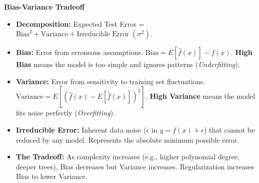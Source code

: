 
\vspace{1mm}
\noindent\textbf{Bias-Variance Tradeoff}
\begin{itemize}[leftmargin=*, nosep]
    \item \textbf{Decomposition:} Expected Test Error = $\text{Bias}^2 + \text{Variance} + \text{Irreducible Error } (\sigma^2)$.
    \item \textbf{Bias:} Error from erroneous assumptions. $\text{Bias} = E[\hat{f}(x)] - f(x)$. \textbf{High Bias} means the model is too simple and ignores patterns (\textit{Underfitting}).
    \item \textbf{Variance:} Error from sensitivity to training set fluctuations. $\text{Variance} = E[(\hat{f}(x) - E[\hat{f}(x)])^2]$. \textbf{High Variance} means the model fits noise perfectly (\textit{Overfitting}).
    \item \textbf{Irreducible Error:} Inherent data noise ($\epsilon$ in $y = f(x) + \epsilon$) that cannot be reduced by any model. Represents the absolute minimum possible error.
    \item \textbf{The Tradeoff:} As complexity increases (e.g., higher polynomial degree, deeper trees), Bias decreases but Variance increases. Regularization increases Bias to lower Variance.
\end{itemize}
